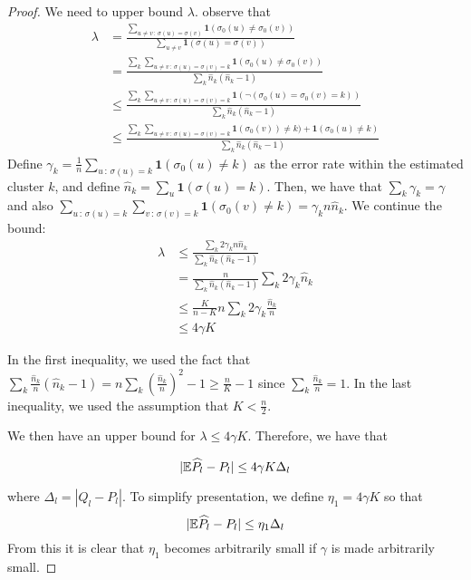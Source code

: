 \begin{proof}
We need to upper bound $\lambda$. observe that
\begin{align*}
\lambda 
  &= \frac{\sum_{u \neq v \,:\, \sigma(u) = \sigma(v) }\mathbf{1}(\sigma_0(u) \neq \sigma_0(v)) }{\sum_{u \neq v} \mathbf{1}(\sigma(u) = \sigma(v)) } 
      \\
  &= 
   \frac{\sum_k \sum_{u \neq v \,:\, \sigma(u)=\sigma(v)=k} \mathbf{1}(\sigma_0(u) \neq \sigma_0(v))}{\sum_k \hat{n}_k (\hat{n}_k-1)} 
      \\
  &\leq \frac{\sum_k \sum_{u \neq v \,:\, \sigma(u)=\sigma(v)=k} 
       \mathbf{1}( \neg (\sigma_0(u) = \sigma_0(v) =k) )}{\sum_k \hat{n}_k (\hat{n}_k-1)} 
      \\ 
  &\leq \frac{ \sum_k \sum_{u \neq v \,:\, \sigma(u)=\sigma(v)=k} \mathbf{1}(\sigma_0(v)) \neq k) + \mathbf{1}(\sigma_0(u) \neq k)}
            {\sum_k \hat{n}_k (\hat{n}_k - 1)} 
\end{align*}
Define $\gamma_k = \frac{1}{n} \sum_{u \,:\, \sigma(u)=k} \mathbf{1}(\sigma_0(u) \neq k)$ as the error rate within the estimated cluster $k$, and define $\hat{n}_k = \sum_u \mathbf{1}(\sigma(u) = k)$. Then, we have that $\sum_k \gamma_k = \gamma$ and also $\sum_{u \,:\, \sigma(u) = k} \sum_{v \,:\, \sigma(v) = k} \mathbf{1}(\sigma_0(v) \neq k) = \gamma_k n \hat{n}_k$. We continue the bound: 
\begin{align*}
\lambda  
  &\leq \frac{ \sum_k 2 \gamma_k n \hat{n}_k }{\sum_k \hat{n}_k(\hat{n}_k - 1)} 
     \\
  &= \frac{n}{\sum_k \hat{n}_k (\hat{n}_k - 1) } \sum_k 2 \gamma_k \hat{n}_k 
     \\
  &\leq \frac{K}{n-K} n \sum_k 2 \gamma_k \frac{\hat{n}_k}{n} \\
  &\leq 4 \gamma K
\end{align*}

In the first inequality, we used the fact that $\sum_k \frac{\hat{n}_k }{n} (\hat{n}_k - 1) = n \sum_k \left( \frac{\hat{n}_k}{n} \right)^2 - 1 \geq \frac{n}{K} - 1$ since $\sum_k \frac{\hat{n}_k}{n} = 1$. In the last inequality, we used the assumption that $K < \frac{n}{2}$. 

We then have an upper bound for $\lambda \leq 4 \gamma K$. Therefore, we have that

\[
|{\mathbb E} \widehat{P}_l - P_l | \leq 4 \gamma K \Delta_l
\]

where $\Delta_l  = |Q_l - P_l|$. To simplify presentation, we define $\eta_1 = 4 \gamma K$ so that
\[
|{\mathbb E} \widehat{P}_l - P_l | \leq \eta_1 \Delta_l
\]
From this it is clear that $\eta_1$ becomes arbitrarily small if $\gamma$ is made arbitrarily small. 


\end{proof}
